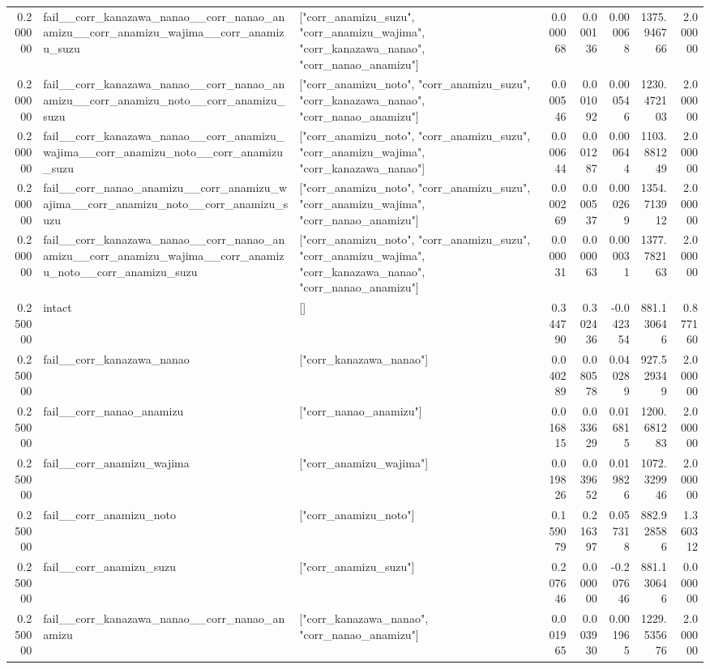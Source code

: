 \begin{tabular}{rllrrrrr}
0.200000 & fail\_\_corr\_kanazawa\_nanao\_\_corr\_nanao\_anamizu\_\_corr\_anamizu\_wajima\_\_corr\_anamizu\_suzu & ["corr\_anamizu\_suzu", "corr\_anamizu\_wajima", "corr\_kanazawa\_nanao", "corr\_nanao\_anamizu"] & 0.000068 & 0.000136 & 0.000068 & 1375.946766 & 2.000000 \\
0.200000 & fail\_\_corr\_kanazawa\_nanao\_\_corr\_nanao\_anamizu\_\_corr\_anamizu\_noto\_\_corr\_anamizu\_suzu & ["corr\_anamizu\_noto", "corr\_anamizu\_suzu", "corr\_kanazawa\_nanao", "corr\_nanao\_anamizu"] & 0.000546 & 0.001092 & 0.000546 & 1230.472103 & 2.000000 \\
0.200000 & fail\_\_corr\_kanazawa\_nanao\_\_corr\_anamizu\_wajima\_\_corr\_anamizu\_noto\_\_corr\_anamizu\_suzu & ["corr\_anamizu\_noto", "corr\_anamizu\_suzu", "corr\_anamizu\_wajima", "corr\_kanazawa\_nanao"] & 0.000644 & 0.001287 & 0.000644 & 1103.881249 & 2.000000 \\
0.200000 & fail\_\_corr\_nanao\_anamizu\_\_corr\_anamizu\_wajima\_\_corr\_anamizu\_noto\_\_corr\_anamizu\_suzu & ["corr\_anamizu\_noto", "corr\_anamizu\_suzu", "corr\_anamizu\_wajima", "corr\_nanao\_anamizu"] & 0.000269 & 0.000537 & 0.000269 & 1354.713912 & 2.000000 \\
0.200000 & fail\_\_corr\_kanazawa\_nanao\_\_corr\_nanao\_anamizu\_\_corr\_anamizu\_wajima\_\_corr\_anamizu\_noto\_\_corr\_anamizu\_suzu & ["corr\_anamizu\_noto", "corr\_anamizu\_suzu", "corr\_anamizu\_wajima", "corr\_kanazawa\_nanao", "corr\_nanao\_anamizu"] & 0.000031 & 0.000063 & 0.000031 & 1377.782163 & 2.000000 \\
0.250000 & intact & [] & 0.344790 & 0.302436 & -0.042354 & 881.130646 & 0.877160 \\
0.250000 & fail\_\_corr\_kanazawa\_nanao & ["corr\_kanazawa\_nanao"] & 0.040289 & 0.080578 & 0.040289 & 927.529349 & 2.000000 \\
0.250000 & fail\_\_corr\_nanao\_anamizu & ["corr\_nanao\_anamizu"] & 0.016815 & 0.033629 & 0.016815 & 1200.681283 & 2.000000 \\
0.250000 & fail\_\_corr\_anamizu\_wajima & ["corr\_anamizu\_wajima"] & 0.019826 & 0.039652 & 0.019826 & 1072.329946 & 2.000000 \\
0.250000 & fail\_\_corr\_anamizu\_noto & ["corr\_anamizu\_noto"] & 0.159079 & 0.216397 & 0.057318 & 882.928586 & 1.360312 \\
0.250000 & fail\_\_corr\_anamizu\_suzu & ["corr\_anamizu\_suzu"] & 0.207646 & 0.000000 & -0.207646 & 881.130646 & 0.000000 \\
0.250000 & fail\_\_corr\_kanazawa\_nanao\_\_corr\_nanao\_anamizu & ["corr\_kanazawa\_nanao", "corr\_nanao\_anamizu"] & 0.001965 & 0.003930 & 0.001965 & 1229.535676 & 2.000000 \\

\end{tabular}
